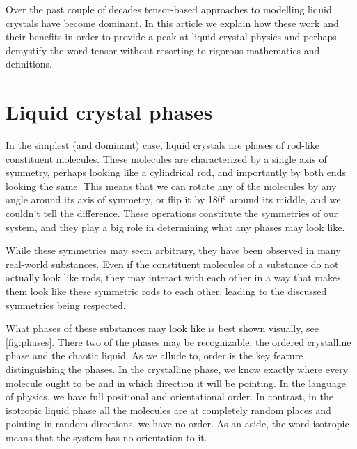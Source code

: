 \documentclass[a4paper,11pt]{article}
\begin{document}
\begin{multicols}{2}
    Over the past couple of decades tensor-based approaches to modelling liquid crystals have become dominant.
    In this article we explain how these work and their benefits in order to provide a peak at liquid crystal physics and perhaps demystify the word tensor without resorting to rigorous mathematics and definitions.

    \section*{Liquid crystal phases}
    In the simplest (and dominant) case, liquid crystals are phases of rod-like constituent molecules.
    These molecules are characterized by a single axis of symmetry, perhaps looking like a cylindrical rod, and importantly by both ends looking the same.
    This means that we can rotate any of the molecules by any angle around its axis of symmetry, or flip it by 180\si{\degree} around its middle, and we couldn't tell the difference.
    These operations constitute the symmetries of our system, and they play a big role in determining what any phases may look like.

    While these symmetries may seem arbitrary, they have been observed in many real-world substances.
    Even if the constituent molecules of a substance do not actually look like rods, they may interact with each other in a way that makes them look like these symmetric rods to each other, leading to the discussed symmetries being respected.

    What phases of these substances may look like is best shown visually, see \cref{fig:phases}.
    There two of the phases may be recognizable, the ordered crystalline phase and the chaotic liquid.
    As we allude to, order is the key feature distinguishing the phases.
    In the crystalline phase, we know exactly where every molecule ought to be and in which direction it will be pointing.
    In the language of physics, we have full positional and orientational order.
    In contrast, in the isotropic liquid phase all the molecules are at completely random places and pointing in random directions, we have no order.
    As an aside, the word isotropic means that the system has no orientation to it.


\end{multicols}
\end{document}
